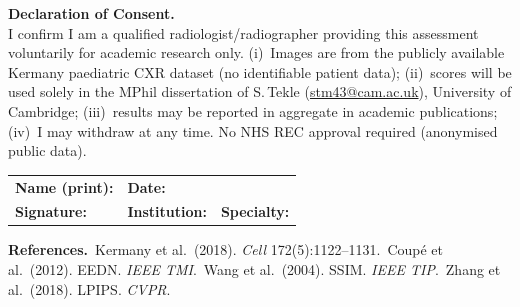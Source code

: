 \documentclass[a4paper,10pt]{article}
\begin{document}
\vspace{0.28cm}

\begin{mdframed}[linewidth=0.8pt, innertopmargin=7pt, innerbottommargin=7pt, innerleftmargin=8pt, innerrightmargin=8pt]
{\small
\noindent\textbf{Declaration of Consent.} \\
I confirm I am a qualified radiologist/radiographer providing this assessment voluntarily for academic research only. 
(i)~Images are from the publicly available Kermany paediatric CXR dataset (no identifiable patient data); 
(ii)~scores will be used solely in the MPhil dissertation of S.\,Tekle (\href{mailto:stm43@cam.ac.uk}{stm43@cam.ac.uk}), University of Cambridge; 
(iii)~results may be reported in aggregate in academic publications; 
(iv)~I may withdraw at any time. No NHS REC approval required (anonymised public data).

\vspace{12pt}

\noindent
\begin{tabularx}{\textwidth}{@{} X X X @{}}
\textbf{Name (print):}\dotfill & \textbf{Date:}\dotfill \\[18pt]
\textbf{Signature:}\dotfill & \textbf{Institution:}\dotfill & \textbf{Specialty:}\dotfill \\
\end{tabularx}
}
\end{mdframed}

{\footnotesize\textbf{References.}\quad
[1]~Kermany et al.\ (2018). \textit{Cell} 172(5):1122--1131.\quad
[2]~Coup\'e et al.\ (2012). EEDN. \textit{IEEE TMI}.\quad
[3]~Wang et al.\ (2004). SSIM. \textit{IEEE TIP}.\quad
[4]~Zhang et al.\ (2018). LPIPS. \textit{CVPR}.}
\end{document}
